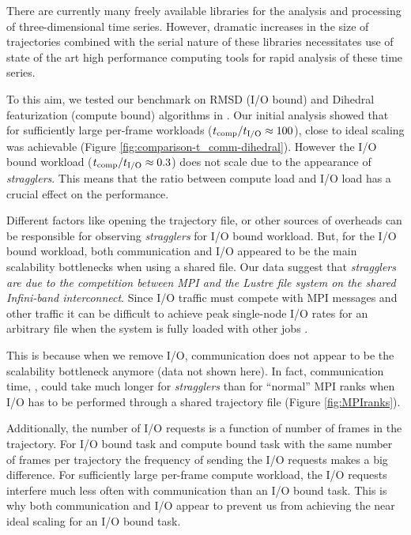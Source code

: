 \label{concl} 
There are currently many freely available libraries for the analysis and processing of three-dimensional time series.
However, dramatic increases in the size of trajectories combined with the serial nature of these libraries necessitates 
use of state of the art high performance computing tools for rapid analysis of these time series. 

To this aim, we tested our benchmark on RMSD (I/O bound) and Dihedral featurization (compute bound) algorithms in .
Our initial analysis showed that for sufficiently large per-frame workloads (${t}_{\text{comp}}/{t}_{\text{I/O}} \approx 100$), close to ideal scaling was achievable (Figure \ref{fig:comparison-t_comm-dihedral}).
However the I/O bound workload (${t}_{\text{comp}}/{t}_{\text{I/O}} \approx 0.3$) does not scale due to the appearance of \emph{stragglers}. 
This means that the ratio between compute load and I/O load has a crucial effect on the performance. 

Different factors like opening the trajectory file, or other sources of overheads can be responsible for observing \emph{stragglers} for I/O bound workload.
But, for the I/O bound workload, both communication and I/O appeared to be the main scalability bottlenecks when using a shared file.
Our data suggest that \emph{stragglers are due to the competition between MPI and the Lustre file system on the shared Infini-band interconnect}.  
Since I/O traffic must compete with MPI messages and other traffic it can be difficult to achieve peak single-node I/O rates for an arbitrary file when the system is fully loaded with other jobs \cite{VMD2013}. 

This is because when we remove I/O, communication does not appear to be the scalability bottleneck anymore (data not shown here).
In fact, communication time, \tcomm, could take
much longer for \emph{stragglers} than for ``normal'' MPI ranks when I/O has to be performed through a shared trajectory file (Figure \ref{fig:MPIranks}). 

Additionally, the number of I/O requests is a function of number of frames in the trajectory. 
For I/O bound task and compute bound task with the same number of frames per trajectory the frequency of sending the I/O requests makes a big difference.
For sufficiently large per-frame compute workload, the I/O requests interfere much less often with communication than an I/O bound task.
This is why both communication and I/O appear to prevent us from achieving the near ideal scaling for an I/O bound task.

